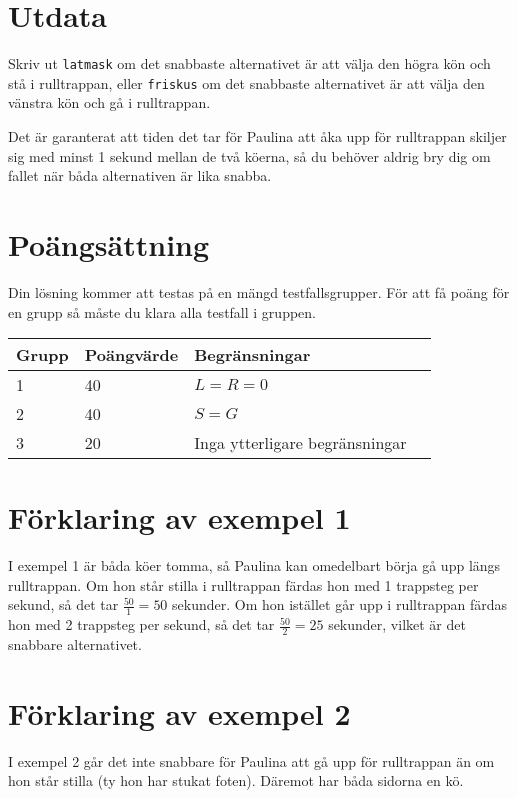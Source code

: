 \section*{Utdata}
Skriv ut \texttt{latmask} om det snabbaste alternativet är att välja den högra kön och stå i rulltrappan, eller \texttt{friskus} om det snabbaste alternativet är att välja den vänstra kön och gå i rulltrappan.

Det är garanterat att tiden det tar för Paulina att åka upp för rulltrappan skiljer sig med minst 1 sekund mellan de två köerna, så du behöver aldrig bry dig om fallet när båda alternativen är lika snabba.

\section*{Poängsättning}
Din lösning kommer att testas på en mängd testfallsgrupper. För att få poäng för en grupp så måste du klara alla testfall i gruppen.

\noindent
\begin{tabular}{|l|l|l|l|}
\hline
Grupp & Poängvärde & Begränsningar \\ \hline
1     & 40         &  $L = R = 0$ \\ \hline
2     & 40         &  $S = G$ \\ \hline
3     & 20         & Inga ytterligare begränsningar \\ \hline
\end{tabular}


\section*{Förklaring av exempel 1}
I exempel 1 är båda köer tomma, så Paulina kan omedelbart börja gå upp längs rulltrappan.
Om hon står stilla i rulltrappan färdas hon med 1 trappsteg per sekund, så det tar $\frac{50}{1} = 50$ sekunder.
Om hon istället går upp i rulltrappan färdas hon med 2 trappsteg per sekund, så det tar $\frac{50}{2} = 25$ sekunder, vilket är det snabbare alternativet.

\section*{Förklaring av exempel 2}
I exempel 2 går det inte snabbare för Paulina att gå upp för rulltrappan än om hon står stilla (ty hon har stukat foten).
Däremot har båda sidorna en kö.


